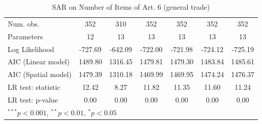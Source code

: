 \begin{table}[!h]
\begin{center}
\begin{tabular}{l c c c c c c }
\midrule
Num. obs.               & 352          & 310         & 352          & 352          & 352          & 352          \\
Parameters              & 12           & 13          & 13           & 13           & 13           & 13           \\
Log Likelihood          & -727.69      & -642.09     & -722.00      & -721.98      & -724.12      & -725.19      \\
AIC (Linear model)      & 1489.80      & 1316.45     & 1479.81      & 1479.30      & 1483.84      & 1485.61      \\
AIC (Spatial model)     & 1479.39      & 1310.18     & 1469.99      & 1469.95      & 1474.24      & 1476.37      \\
LR test: statistic      & 12.42        & 8.27        & 11.82        & 11.35        & 11.60        & 11.24        \\
LR test: p-value        & 0.00         & 0.00        & 0.00         & 0.00         & 0.00         & 0.00         \\
\bottomrule
\multicolumn{7}{l}{\scriptsize{$^{***}p<0.001$, $^{**}p<0.01$, $^*p<0.05$}}
\end{tabular}
\caption{SAR on Number of Items of Art. 6 (general trade)}
\label{table:coefficients}
\end{center}
\end{table}
